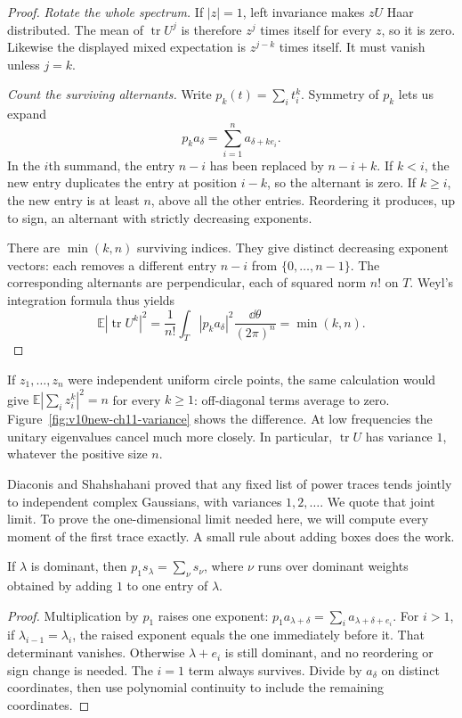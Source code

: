 \begin{proof}
\emph{Rotate the whole spectrum.} If $|z|=1$, left invariance makes $zU$ Haar distributed. The mean of $\operatorname{tr}U^j$ is therefore $z^j$ times itself for every $z$, so it is zero. Likewise the displayed mixed expectation is $z^{j-k}$ times itself. It must vanish unless $j=k$.

\emph{Count the surviving alternants.} Write $p_k(t)=\sum_i t_i^k$. Symmetry of $p_k$ lets us expand
\[
p_k a_\delta=\sum_{i=1}^n a_{\delta+ke_i}.
\]
In the $i$th summand, the entry $n-i$ has been replaced by $n-i+k$. If $k<i$, the new entry duplicates the entry at position $i-k$, so the alternant is zero. If $k\ge i$, the new entry is at least $n$, above all the other entries. Reordering it produces, up to sign, an alternant with strictly decreasing exponents.

There are $\min(k,n)$ surviving indices. They give distinct decreasing exponent vectors: each removes a different entry $n-i$ from $\{0,\ldots,n-1\}$. The corresponding alternants are perpendicular, each of squared norm $n!$ on $T$. Weyl's integration formula thus yields
\[
\mathbb E|\operatorname{tr}U^k|^2
=\frac1{n!}\int_T|p_k a_\delta|^2\frac{\dd\theta}{(2\pi)^n}
=\min(k,n).
\]
\end{proof}

If $z_1,\ldots,z_n$ were independent uniform circle points, the same calculation would give $\mathbb E|\sum_i z_i^k|^2=n$ for every $k\ge1$: off-diagonal terms average to zero. Figure~\ref{fig:v10new-ch11-variance} shows the difference. At low frequencies the unitary eigenvalues cancel much more closely. In particular, $\operatorname{tr}U$ has variance $1$, whatever the positive size $n$.

Diaconis and Shahshahani proved that any fixed list of power traces tends jointly to independent complex Gaussians, with variances $1,2,\ldots$. We quote that joint limit. To prove the one-dimensional limit needed here, we will compute every moment of the first trace exactly. A small rule about adding boxes does the work.

\begin{lemma}\label{lem:pieri}
If $\lambda$ is dominant, then
$p_1s_\lambda=\sum_\nu s_\nu$, where $\nu$ runs over dominant weights obtained by adding $1$ to one entry of $\lambda$.
\end{lemma}

\begin{proof}
Multiplication by $p_1$ raises one exponent:
$p_1a_{\lambda+\delta}=\sum_i a_{\lambda+\delta+e_i}$.
For $i>1$, if $\lambda_{i-1}=\lambda_i$, the raised exponent equals the one immediately before it. That determinant vanishes. Otherwise $\lambda+e_i$ is still dominant, and no reordering or sign change is needed. The $i=1$ term always survives. Divide by $a_\delta$ on distinct coordinates, then use polynomial continuity to include the remaining coordinates.
\end{proof}

